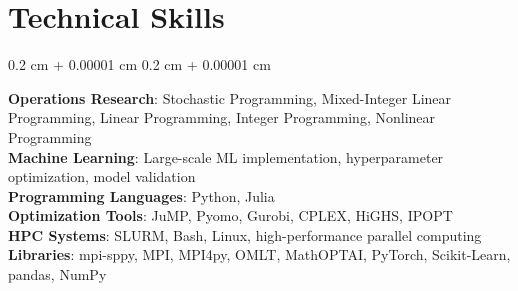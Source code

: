\documentclass[10pt, letterpaper]{article}
\newenvironment{onecolentry}{
    \begin{adjustwidth}{
        0.2 cm + 0.00001 cm
    }{
        0.2 cm + 0.00001 cm
    }
}{
    \end{adjustwidth}
} %
\begin{document}
\section{Technical Skills}
\begin{onecolentry}
    \textbf{Operations Research}: Stochastic Programming, Mixed-Integer Linear Programming, Linear Programming, Integer Programming, Nonlinear Programming\\
    \textbf{Machine Learning}: Large-scale ML implementation, hyperparameter optimization, model validation\\
    \textbf{Programming Languages}: Python, Julia\\
    \textbf{Optimization Tools}: JuMP, Pyomo, Gurobi, CPLEX, HiGHS, IPOPT\\
    \textbf{HPC Systems}: SLURM, Bash, Linux, high-performance parallel computing\\
    \textbf{Libraries}: mpi-sppy, MPI, MPI4py, OMLT, MathOPTAI, PyTorch, Scikit-Learn, pandas, NumPy
\end{onecolentry}
\end{document}
